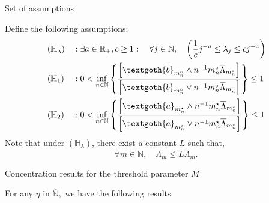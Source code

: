 \documentclass[final,hyperref={pdfpagelabels=false}]{beamer}
\begin{document}
\begin{frame}[t]
\begin{columns}[t]
\begin{column}{.30\textwidth}
\begin{block}{\rule{0pt}{2.5ex} Set of assumptions}
Define the following assumptions:
\begin{alignat*}{2}
&\left(\mathbb{H}_{\lambda}\right) &&: \exists a \in \mathbb{R}_{+}, c \geq 1 : \quad \forall j \in \mathbb{N}, \quad \left(\frac{1}{c} j^{-a} \leq \lambda_{j} \leq c j^{-a}\right)\\
&\left(\mathbb{H}_{1}\right) &&: 0 <\inf\limits_{n \in \mathbb{N}} \left\{\frac{\left[\textgoth{b}_{m_{n}^{\circ}}\wedge n^{-1} m_{n}^{\circ} \overline{\Lambda}_{m_{n}^{\circ}}\right]}{\left[\textgoth{b}_{m_{n}^{\circ}}\vee n^{-1} m_{n}^{\circ} \overline{\Lambda}_{m_{n}^{\circ}}\right]}\right\} \leq 1\\
&\left(\mathbb{H}_{2}\right) &&: 0 <\inf\limits_{n \in \mathbb{N}} \left\{\frac{\left[\textgoth{a}_{m_{n}^{\star}}\wedge n^{-1} m_{n}^{\star} \overline{\Lambda}_{m_{n}^{\star}}\right]}{\left[\textgoth{a}_{m_{n}^{\star}}\vee n^{-1} m_{n}^{\star} \overline{\Lambda}_{m_{n}^{\star}}\right]}\right\} \leq 1\\
\end{alignat*}
Note that under $\left(\mathbb{H}_{\lambda}\right)$, there exist a constant $L$ such that,
\[\forall m \in \mathbb{N}, \quad \Lambda_{m} \leq L \overline{\Lambda}_{m}.\]
\end{block}

\begin{block}{\rule{0pt}{2.5ex} Concentration results for the threshold parameter $M$}
For any $\eta$ in $\overline{\mathbb{N}},$ we have the following results:

\medskip


\end{block}
\end{column}
\end{columns}
\end{frame}
\end{document}
